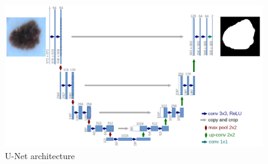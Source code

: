 \begin{figure}
    \centerline{\includegraphics[width=1\columnwidth]{02-related-works/figures/u-net-architecture.png}}
    \caption{ U-Net architecture \cite{ronneberger2015u} }
    \label{figure:unet-architecture}
\end{figure}
